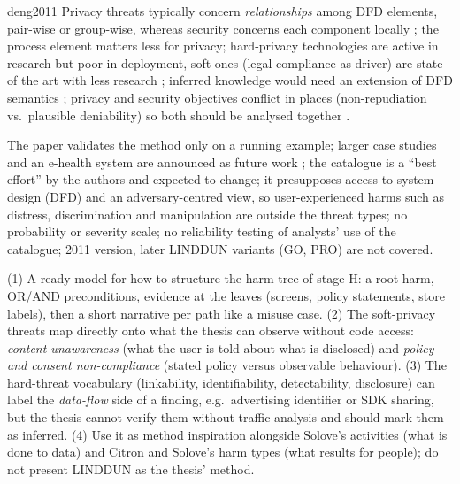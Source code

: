 \begin{papercard}{deng2011}
 Privacy threats typically concern \emph{relationships} among DFD elements, pair-wise or group-wise, whereas security concerns each component locally ; the process element matters less for privacy; hard-privacy technologies are active in research but poor in deployment, soft ones (legal compliance as driver) are state of the art with less research ; inferred knowledge would need an extension of DFD semantics ; privacy and security objectives conflict in places (non-repudiation vs.\ plausible deniability) so both should be analysed together .

 The paper validates the method only on a running example; larger case studies and an e-health system are announced as future work ; the catalogue is a ``best effort'' by the authors and expected to change; it presupposes access to system design (DFD) and an adversary-centred view, so user-experienced harms such as distress, discrimination and manipulation are outside the threat types; no probability or severity scale; no reliability testing of analysts' use of the catalogue; 2011 version, later LINDDUN variants (GO, PRO) are not covered.

 (1) A ready model for how to structure the harm tree of stage H: a root harm, OR/AND preconditions, evidence at the leaves (screens, policy statements, store labels), then a short narrative per path like a misuse case. (2) The soft-privacy threats map directly onto what the thesis can observe without code access: \emph{content unawareness} (what the user is told about what is disclosed) and \emph{policy and consent non-compliance} (stated policy versus observable behaviour). (3) The hard-threat vocabulary (linkability, identifiability, detectability, disclosure) can label the \emph{data-flow} side of a finding, e.g.\ advertising identifier or SDK sharing, but the thesis cannot verify them without traffic analysis and should mark them as inferred. (4) Use it as method inspiration alongside Solove's activities (what is done to data) and Citron and Solove's harm types (what results for people); do not present LINDDUN as the thesis' method.
\end{papercard}
